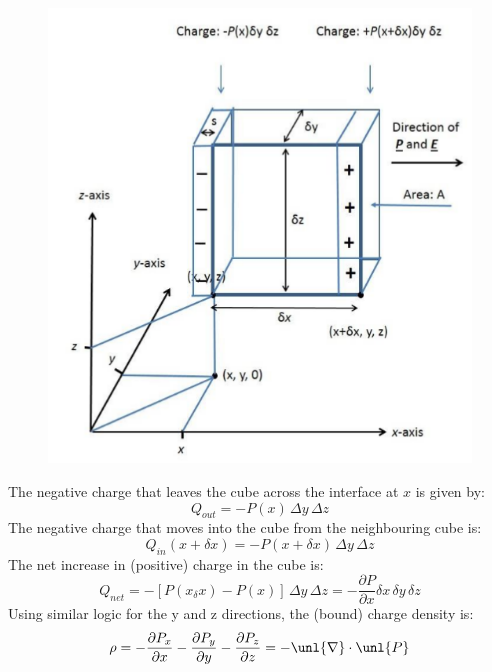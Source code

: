 \documentclass[a4paper, 11pt, normalem]{report}
\newcommand\p{\partial}
\newcommand\del{\unl{\nabla}}
\begin{document}
\begin{figure}
	\centering
	\includegraphics[scale=0.38]{dibox.png}
\end{figure}

The negative charge that leaves the cube across the interface at $x$ is given by:
\begin{equation*}
    Q_{out} = -P(x)\,\Delta y \,\Delta z
\end{equation*}
The negative charge that moves into the cube from the neighbouring cube is:
\begin{equation*}
    Q_{in}(x+\delta x) = -P(x+\delta x)\,\Delta y \, \Delta z
\end{equation*}
The net increase in (positive) charge in the cube is:
\begin{equation*}
    Q_{net} = -\left[P(x_\delta x)-P(x)\right]\,\Delta y\,\Delta z = -\frac{\p P}{\p x} \delta x \, \delta y \, \delta z
\end{equation*}
Using similar logic for the y and z directions, the (bound) charge density is:
\begin{equation*}
    \rho = -\frac{\p P_x}{\p x} - \frac{\p P_y}{\p y} - \frac{\p P_z}{\p z} = -\del\cdot\unl{P}
\end{equation*}
\end{document}
